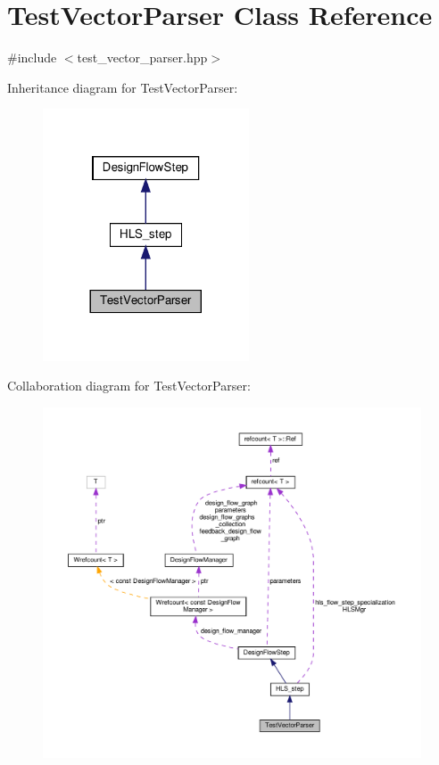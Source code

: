 \hypertarget{classTestVectorParser}{}\section{Test\+Vector\+Parser Class Reference}
\label{classTestVectorParser}


{\ttfamily \#include $<$test\+\_\+vector\+\_\+parser.\+hpp$>$}



Inheritance diagram for Test\+Vector\+Parser\+:
\nopagebreak
\begin{figure}[H]
\begin{center}
\leavevmode
\includegraphics[width=173pt]{db/db4/classTestVectorParser__inherit__graph}
\end{center}
\end{figure}


Collaboration diagram for Test\+Vector\+Parser\+:
\nopagebreak
\begin{figure}[H]
\begin{center}
\leavevmode
\includegraphics[width=350pt]{db/dfc/classTestVectorParser__coll__graph}
\end{center}
\end{figure}

